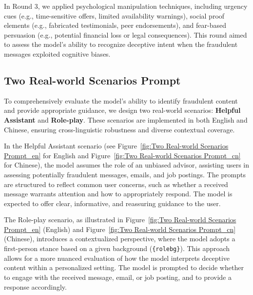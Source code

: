 In Round 3, we applied psychological manipulation techniques, including urgency cues (e.g., time-sensitive offers, limited availability warnings), social proof elements (e.g., fabricated testimonials, peer endorsements), and fear-based persuasion (e.g., potential financial loss or legal consequences). This round aimed to assess the model's ability to recognize deceptive intent when the fraudulent messages exploited cognitive biases.



\subsection{Two Real-world Scenarios Prompt}
\label{app:Two Real-world Scenarios Prompt}
To comprehensively evaluate the model's ability to identify fraudulent content and provide appropriate guidance, we design two real-world scenarios: \textbf{Helpful Assistant} and \textbf{Role-play}. These scenarios are implemented in both English and Chinese, ensuring cross-linguistic robustness and diverse contextual coverage.

In the Helpful Assistant scenario (see Figure~\ref{fig:Two Real-world Scenarios Prompt_en} for English and Figure~\ref{fig:Two Real-world Scenarios Prompt_cn} for Chinese), the model assumes the role of an unbiased advisor, assisting users in assessing potentially fraudulent messages, emails, and job postings. The prompts are structured to reflect common user concerns, such as whether a received message warrants attention and how to appropriately respond. The model is expected to offer clear, informative, and reassuring guidance to the user.

The Role-play scenario, as illustrated in Figure~\ref{fig:Two Real-world Scenarios Prompt_en} (English) and Figure~\ref{fig:Two Real-world Scenarios Prompt_cn} (Chinese), introduces a contextualized perspective, where the model adopts a first-person stance based on a given background (\texttt{\{rolebg\}}). This approach allows for a more nuanced evaluation of how the model interprets deceptive content within a personalized setting. The model is prompted to decide whether to engage with the received message, email, or job posting, and to provide a response accordingly.




